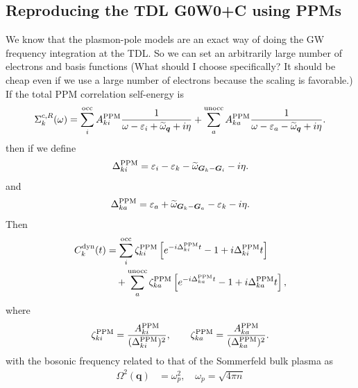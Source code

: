 \subsection{Reproducing the TDL G0W0+C using PPMs}
We know that the plasmon-pole models are an exact way of doing the GW frequency integration at the TDL. So we can set an arbitrarily large number of electrons and basis functions (What should I choose specifically? It should be cheap even if we use a large number of electrons because the scaling is favorable.) If the total PPM correlation self-energy is
\begin{align}
\Sigma_k^{c,R}(\omega)
=
\sum_i^{\rm occ}
A_{ki}^{\rm PPM}
\frac{1}{\omega-\varepsilon_i+\widetilde{\omega}_{\bm q}+i\eta}
+
\sum_a^{\rm unocc}
A_{ka}^{\rm PPM}
\frac{1}{\omega-\varepsilon_a-\widetilde{\omega}_{\bm q}+i\eta}.
\end{align}
then if we define
\begin{align}
\Delta_{ki}^{\rm PPM}
=
\varepsilon_i-\varepsilon_k-\widetilde{\omega}_{\bm G_k-\bm G_i}-i\eta.
\end{align}
and
\begin{align}
\Delta_{ka}^{\rm PPM}
=
\varepsilon_a+\widetilde{\omega}_{\bm G_k-\bm G_a}-\varepsilon_k-i\eta.
\end{align}
Then
\begin{align}
C_k^{\rm dyn}(t)
&=
\sum_i^{\rm occ}
\zeta_{ki}^{\rm PPM}
\left[
e^{-i\Delta_{ki}^{\rm PPM}t}
-1
+i\Delta_{ki}^{\rm PPM}t
\right]
\\
&\quad+
\sum_a^{\rm unocc}
\zeta_{ka}^{\rm PPM}
\left[
e^{-i\Delta_{ka}^{\rm PPM}t}
-1
+i\Delta_{ka}^{\rm PPM}t
\right],
\end{align}
where
\begin{align}
\zeta_{ki}^{\rm PPM}
=
\frac{A_{ki}^{\rm PPM}}
     {(\Delta_{ki}^{\rm PPM})^2},
\qquad
\zeta_{ka}^{\rm PPM}
=
\frac{A_{ka}^{\rm PPM}}
     {(\Delta_{ka}^{\rm PPM})^2}.
\end{align}
with the bosonic frequency related to that of the Sommerfeld bulk plasma as
\begin{align}
\Omega^2(\mathbf q)
&=
\omega_p^2, \quad \omega_p = \sqrt{4 \pi n}
\end{align}
